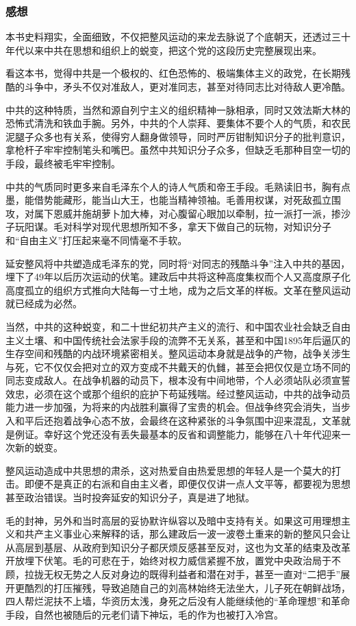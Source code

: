 \subsubsection{感想}
本书史料翔实，全面细致，不仅把整风运动的来龙去脉说了个底朝天，还透过三十年代以来中共在思想和组织上的蜕变，把这个党的这段历史完整展现出来。

看这本书，觉得中共是一个极权的、红色恐怖的、极端集体主义的政党，在长期残酷的斗争中，矛头不仅对准敌人，更对准同志，甚至对待同志比对待敌人更冷酷。

中共的这种特质，当然和源自列宁主义的组织精神一脉相承，同时又效法斯大林的恐怖式清洗和铁血手腕。另外，中共的个人崇拜、要集体不要个人的气质，和农民泥腿子众多也有关系，使得穷人翻身做领导，同时严厉钳制知识分子的批判意识，拿枪杆子牢牢控制笔头和嘴巴。虽然中共知识分子众多，但缺乏毛那种目空一切的手段，最终被毛牢牢控制。

中共的气质同时更多来自毛泽东个人的诗人气质和帝王手段。毛熟读旧书，胸有点墨，能借势能藏形，能当山大王，也能当精神领袖。毛善用权谋，对死敌孤立围攻，对属下恩威并施胡萝卜加大棒，对心腹留心眼加以牵制，拉一派打一派，掺沙子玩阳谋。毛对科学对现代思想所知不多，拿天下做自己的玩物，对知识分子和“自由主义”打压起来毫不同情毫不手软。

延安整风将中共塑造成毛泽东的党，同时将“对同志的残酷斗争”注入中共的基因，埋下了49年以后历次运动的伏笔。建政后中共将这种高度集权而个人又高度原子化高度孤立的组织方式推向大陆每一寸土地，成为之后文革的样板。文革在整风运动就已经成为必然。

当然，中共的这种蜕变，和二十世纪初共产主义的流行、和中国农业社会缺乏自由主义土壤、和中国传统社会法家手段的流弊不无关系，甚至和中国1895年后逼仄的生存空间和残酷的内战环境紧密相关。整风运动本身就是战争的产物，战争关涉生与死，它不仅仅会把对立的双方变成不共戴天的仇雠，甚至会把仅仅是立场不同的同志变成敌人。在战争机器的动员下，根本没有中间地带，个人必须站队必须宣誓效忠，必须在这个或那个组织的庇护下苟延残喘。经过整风运动，中共的战争动员能力进一步加强，为将来的内战胜利赢得了宝贵的机会。但战争终究会消失，当步入和平后还抱着战争心态不放，会最终在这种紧张的斗争氛围中迎来混乱，文革就是例证。幸好这个党还没有丢失最基本的反省和调整能力，能够在八十年代迎来一次新的蜕变。

整风运动造成中共思想的肃杀，这对热爱自由热爱思想的年轻人是一个莫大的打击。即便不是真正的右派和自由主义者，即便仅仅讲一点人文平等，都要视为思想甚至政治错误。当时投奔延安的知识分子，真是进了地狱。

毛的封神，另外和当时高层的妥协默许纵容以及暗中支持有关。如果这可用理想主义和共产主义事业心来解释的话，那么建政后一波一波卷土重来的新的整风只会让从高层到基层、从政府到知识分子都厌烦反感甚至反对，这也为文革的结束及改革开放埋下伏笔。毛的可悲在于，始终对权力威信紧握不放，置党中央政治局于不顾，拉拢无权无势之人反对身边的既得利益者和潜在对手，甚至一直对“二把手”展开更酷烈的打压摧残，导致追随自己的刘高林始终无法坐大，儿子死在朝鲜战场，四人帮烂泥扶不上墙，华资历太浅，身死之后没有人能继续他的“革命理想”和革命手段，自然也被随后的元老们请下神坛，毛的作为也被打入冷宫。